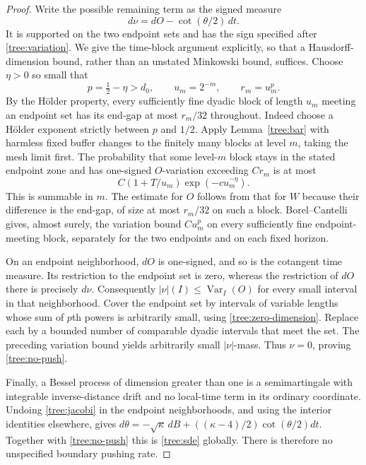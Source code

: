 \begin{proof}
Write the possible remaining term as the signed measure
\[
 d\nu=dO-\cot(\theta/2)\,dt.
\]
It is supported on the two endpoint sets and has the sign specified
after \eqref{tree:variation}.  We give the time-block argument
explicitly, so that a Hausdorff-dimension bound, rather than an unstated
Minkowski bound, suffices.  Choose $\eta>0$ so small that
\[
 p=\tfrac12-\eta>d_0,
 \qquad u_m=2^{-m},\qquad r_m=u_m^p.
\]
By the H\"older property, every sufficiently fine dyadic block of
length $u_m$ meeting an endpoint set has its end-gap at most $r_m/32$
throughout.  Indeed choose a H\"older exponent strictly between $p$
and $1/2$.  Apply Lemma~\ref{tree:bar} with harmless fixed buffer
changes to the finitely many blocks at level $m$, taking the mesh
limit first.  The probability that some level-$m$ block stays in the
stated endpoint zone and has one-signed $O$-variation exceeding $Cr_m$
is at most
\begin{equation}\label{tree:block-sum}
 C(1+T/u_m)\exp(-c u_m^{-\eta}).
\end{equation}
This is summable in $m$.  The estimate for $O$ follows from that for
$W$ because their difference is the end-gap, of size at most $r_m/32$
on such a block.  Borel--Cantelli gives, almost surely, the variation
bound $Cu_m^p$ on every sufficiently fine endpoint-meeting block,
separately for the two endpoints and on each fixed horizon.

On an endpoint neighborhood, $dO$ is one-signed, and so is the
cotangent time measure.  Its restriction to the endpoint set is zero,
whereas the restriction of $dO$ there is precisely $d\nu$.
Consequently $|\nu|(I)\le\operatorname{Var}_I(O)$ for every small
interval in that neighborhood.  Cover the endpoint set by intervals
of variable lengths whose sum of $p$th powers is arbitrarily small,
using \eqref{tree:zero-dimension}.  Replace each by a bounded number
of comparable dyadic intervals that meet the set.  The preceding
variation bound yields arbitrarily small $|\nu|$-mass.  Thus
$\nu=0$, proving \eqref{tree:no-push}.

Finally, a Bessel process of dimension greater than one is a
semimartingale with integrable inverse-distance drift and no local-time
term in its ordinary coordinate.  Undoing \eqref{tree:jacobi} in the
endpoint neighborhoods, and using the interior identities elsewhere,
gives
$d\theta=-\sqrt\kappa\,dB+((\kappa-4)/2)\cot(\theta/2)dt$.
Together with \eqref{tree:no-push} this is \eqref{tree:sde} globally.
There is therefore no unspecified boundary pushing rate.
\end{proof}

